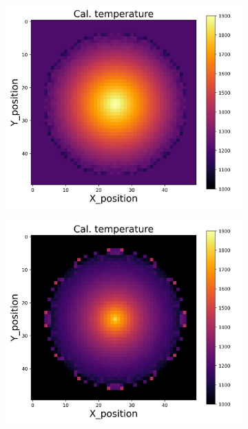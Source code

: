 {\begin{figure}[p]
\begin{minipage}{\textwidth}
\begin{subfigure}{0.325\textwidth}
        \end{subfigure}
        \begin{subfigure}{0.325\textwidth}
            \centering
            \includegraphics[width=\textwidth]{figures/raw_data/26/mix/T_cal.jpg}
        \end{subfigure}
        \begin{subfigure}{0.325\textwidth}
            \centering
            \includegraphics[width=\textwidth]{figures/raw_data/31/mix/T_cal.jpg}

\end{subfigure}
\end{minipage}
\end{figure}}
